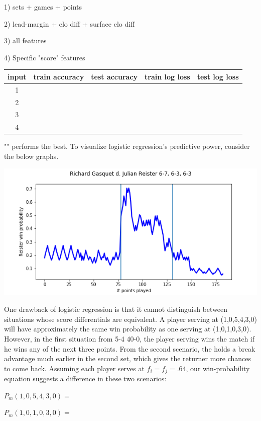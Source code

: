 \documentclass[11pt]{article}
\begin{document}
1) sets + games + points

2) lead-margin + elo diff + surface elo diff

3) all features

4) Specific "score" features

\begin{center}
\begin{tabular}{ |c|c|c|c|c| } 
 \hline
 input & train accuracy & test accuracy
& train log loss & test log loss \\ 
 \hline
 1 &  &  &  & \\ 
 \hline
 2 &  &  &  & \\ 
 \hline
 3 &  &  &  & \\ 
 \hline
 4 &  &  &  & \\ 
 \hline
\end{tabular}
\end{center}

"" performs the best.
To visualize logistic regression's predictive power, consider the below graphs.


\includegraphics[scale=.7]{gasquet_reister_9_6_all_features}


One drawback of logistic regression is that it cannot distinguish between situations whose score differentials are equivalent. A player serving at (1,0,5,4,3,0) will have approximately the same win probability as one serving at (1,0,1,0,3,0). However, in the first situation from 5-4 40-0, the player serving wins the match if he wins any of the next three points. From the second scenario, the holds a break advantage much earlier in the second set, which gives the returner more chances to come back. Assuming each player serves at $f_i=f_j=.64$, our win-probability equation suggests a difference in these two scenarios:

$P_m(1,0,5,4,3,0) = $

$P_m(1,0,1,0,3,0) = $
\end{document}
